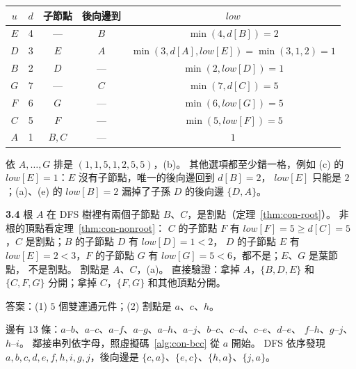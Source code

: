 \begin{center}
\small
\begin{tabular}{ccccc}
\toprule
$u$ & $d$ & 子節點 & 後向邊到 & $\mathit{low}$ \\
\midrule
$E$ & 4 & — & $B$ & $\min(4, d[B]) = 2$ \\
$D$ & 3 & $E$ & $A$ & $\min(3, d[A], \mathit{low}[E]) = \min(3, 1, 2) = 1$ \\
$B$ & 2 & $D$ & — & $\min(2, \mathit{low}[D]) = 1$ \\
$G$ & 7 & — & $C$ & $\min(7, d[C]) = 5$ \\
$F$ & 6 & $G$ & — & $\min(6, \mathit{low}[G]) = 5$ \\
$C$ & 5 & $F$ & — & $\min(5, \mathit{low}[F]) = 5$ \\
$A$ & 1 & $B, C$ & — & $1$ \\
\bottomrule
\end{tabular}
\end{center}

依 $A, \ldots, G$ 排是 $(1, 1, 5, 1, 2, 5, 5)$，(b)。 其他選項都至少錯一格，例如 (c) 的 $\mathit{low}[E] = 1$：$E$ 沒有子節點，唯一的後向邊回到 $d[B] = 2$，
$\mathit{low}[E]$ 只能是 $2$；(a)、(e) 的 $\mathit{low}[B] = 2$ 漏掉了子孫 $D$ 的後向邊 $\{D, A\}$。

\textbf{3.4} 根 $A$ 在 DFS 樹裡有兩個子節點 $B$、$C$，是割點（定理~\ref{thm:con-root}）。 非根的頂點看定理~\ref{thm:con-nonroot}：
$C$ 的子節點 $F$ 有 $\mathit{low}[F] = 5 \ge d[C] = 5$，$C$ 是割點；$B$ 的子節點 $D$ 有 $\mathit{low}[D] = 1 < 2$，
$D$ 的子節點 $E$ 有 $\mathit{low}[E] = 2 < 3$，$F$ 的子節點 $G$ 有 $\mathit{low}[G] = 5 < 6$，都不是；$E$、$G$ 是葉節點，
不是割點。 割點是 $A$、$C$，(a)。 直接驗證：拿掉 $A$，$\{B, D, E\}$ 和 $\{C, F, G\}$ 分開；拿掉 $C$，$\{F, G\}$
和其他頂點分開。

答案：(1) $5$ 個雙連通元件；(2) 割點是 $a$、$c$、$h$。

邊有 $13$ 條：$a$--$b$、$a$--$c$、$a$--$f$、$a$--$g$、$a$--$h$、$a$--$j$、$b$--$c$、$c$--$d$、$c$--$e$、$d$--$e$、
$f$--$h$、$g$--$j$、$h$--$i$。 鄰接串列依字母，照虛擬碼~\ref{alg:con-bcc} 從 $a$ 開始。 DFS 依序發現
$a, b, c, d, e, f, h, i, g, j$，後向邊是 $\{c, a\}$、$\{e, c\}$、$\{h, a\}$、$\{j, a\}$。

